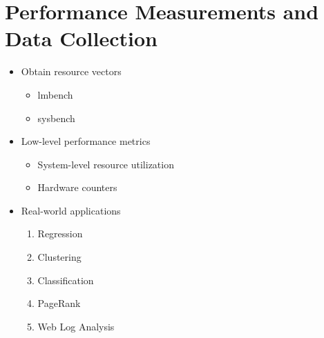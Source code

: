 \section{Performance Measurements and Data Collection}
\label{sec:measurement}

\begin{itemize}
  \item Obtain resource vectors
  	\begin{itemize}
	  \item lmbench
	  \item sysbench  	
  	\end{itemize}
  \item Low-level performance metrics
  	\begin{itemize}
	  \item System-level resource utilization
	  \item Hardware counters
  	\end{itemize}
  \item Real-world applications
  	\begin{enumerate}
  	  \item Regression
  	  \item Clustering
  	  \item Classification
  	  \item PageRank
  	  \item Web Log Analysis
  	\end{enumerate}
\end{itemize}